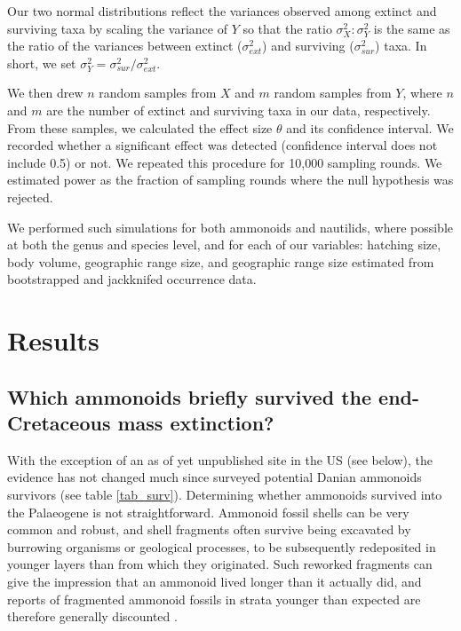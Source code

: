 \documentclass[a4paper]{article}
\begin{document}
Our two normal distributions reflect the variances observed among extinct and surviving taxa by scaling the variance of $Y$ so that the ratio $\sigma^{2}_{X} : \sigma^{2}_{Y}$ is the same as the ratio of the variances between extinct ($\sigma^{2}_{ext}$) and surviving ($\sigma^{2}_{sur}$) taxa. In short, we set $\sigma^{2}_{Y} = \sigma^{2}_{sur} / \sigma^{2}_{ext}$.

We then drew $n$ random samples from $X$ and $m$ random samples from $Y$, where $n$ and $m$ are the number of extinct and surviving taxa in our data, respectively. From these samples, we calculated the effect size $\theta$ and its confidence interval. We recorded whether a significant effect was detected (confidence interval does not include 0.5) or not. We repeated this procedure for 10,000 sampling rounds. We estimated power as the fraction of sampling rounds where the null hypothesis was rejected. 

We performed such simulations for both ammonoids and nautilids, where possible at both the genus and species level, and for each of our variables: hatching size, body volume, geographic range size, and geographic range size estimated from bootstrapped and jackknifed occurrence data.


\section*{Results}


\subsection*{Which ammonoids briefly survived the end-Cretaceous mass extinction?} 
\label{subsec_amsurv}

With the exception of an as of yet unpublished site in the US (see below), the evidence has not changed much since \textcite{landmanAmmoniteExtinctionNautilid2014} surveyed potential Danian ammonoids survivors (see table \ref{tab_surv}). Determining whether ammonoids survived into the Palaeogene is not straightforward. Ammonoid fossil shells can be very common and robust, and shell fragments often survive being excavated by burrowing organisms or geological processes, to be subsequently redeposited in younger layers than from which they originated. Such reworked fragments can give the impression that an ammonoid lived longer than it actually did, and reports of fragmented ammonoid fossils in strata younger than expected are therefore generally discounted  \parencite{machalskiDanianAmmonitesDiscussion2002, zinsmeisterDiscoveryFishMortality1998, wittsEvolutionExtinctionMaastrichtian2015, landmanAmmonitesBrinkExtinction2015}.
\end{document}
